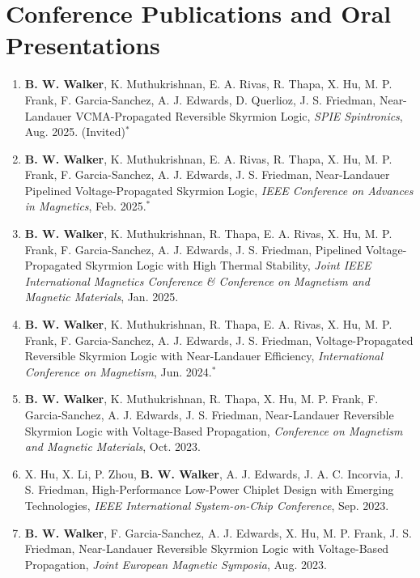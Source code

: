 \documentclass[letterpaper,11pt]{article}
\begin{document}
\section{Conference Publications and Oral Presentations}
    \begin{itemize}[leftmargin=0.15in, label={}]
        \small{\item{
        \begin{enumerate}[leftmargin=0.15in]
          \item \small{\textbf{B. W. Walker}, K. Muthukrishnan, E. A. Rivas, R. Thapa, X. Hu, M. P. Frank, F. Garcia-Sanchez, A. J. Edwards, D. Querlioz, J. S. Friedman, Near-Landauer VCMA-Propagated Reversible Skyrmion Logic, \textit{SPIE Spintronics}, Aug. 2025. (Invited)$^{*}$}
          \item \small{\textbf{B. W. Walker}, K. Muthukrishnan, E. A. Rivas, R. Thapa, X. Hu, M. P. Frank, F. Garcia-Sanchez, A. J. Edwards, J. S. Friedman, Near-Landauer Pipelined Voltage-Propagated Skyrmion Logic, \textit{IEEE Conference on Advances in Magnetics}, Feb. 2025.$^{*}$}
          \item \small{\textbf{B. W. Walker}, K. Muthukrishnan, R. Thapa, E. A. Rivas, X. Hu, M. P. Frank, F. Garcia-Sanchez, A. J. Edwards, J. S. Friedman, Pipelined Voltage-Propagated Skyrmion Logic with High Thermal Stability, \textit{Joint IEEE International Magnetics Conference \& Conference on Magnetism and Magnetic Materials}, Jan. 2025.}
          \item \small{\textbf{B. W. Walker}, K. Muthukrishnan, R. Thapa, E. A. Rivas, X. Hu, M. P. Frank, F. Garcia-Sanchez, A. J. Edwards, J. S. Friedman, Voltage-Propagated Reversible Skyrmion Logic with Near-Landauer Efficiency, \textit{International Conference on Magnetism}, Jun. 2024.$^{*}$}
          \item \small{\textbf{B. W. Walker}, K. Muthukrishnan, R. Thapa, X. Hu, M. P. Frank, F. Garcia-Sanchez, A. J. Edwards, J. S. Friedman, Near-Landauer Reversible Skyrmion Logic with Voltage-Based Propagation, \textit{Conference on Magnetism and Magnetic Materials}, Oct. 2023.}
          \item \small{X. Hu, X. Li, P. Zhou, \textbf{B. W. Walker}, A. J. Edwards, J. A. C. Incorvia, J. S. Friedman, High-Performance Low-Power Chiplet Design with Emerging Technologies, \textit{IEEE International System-on-Chip Conference}, Sep. 2023.}
          \item \small{\textbf{B. W. Walker}, F. Garcia-Sanchez, A. J. Edwards, X. Hu, M. P. Frank, J. S. Friedman, Near-Landauer Reversible Skyrmion Logic with Voltage-Based Propagation, \textit{Joint European Magnetic Symposia}, Aug. 2023.}

\end{enumerate}}}
\end{itemize}
\end{document}
